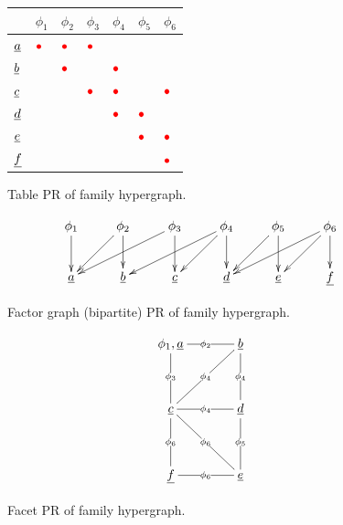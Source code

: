 \begin{itemize}
\begin{figure}[h!]
\begin{tabular}{|l|l|l|l|l|l|l|}
\hline
 & \cellcolor[HTML]{FFCCC9}$\phi_1$ & \cellcolor[HTML]{FFCCC9}$\phi_2$ & \cellcolor[HTML]{FFCCC9}$\phi_3$ & \cellcolor[HTML]{FFCCC9}$\phi_4$ & \cellcolor[HTML]{FFCCC9}$\phi_5$ & \cellcolor[HTML]{FFCCC9}$\phi_6$ \\ \hline
\cellcolor[HTML]{9AFF99}$\rva$ & $\color{red}\bullet$ & $\color{red}\bullet$ & $\color{red}\bullet$ &  &  &  \\ \hline
\cellcolor[HTML]{9AFF99}$\rvb$ &  & $\color{red}\bullet$ &  & $\color{red}\bullet$ &  &  \\ \hline
\cellcolor[HTML]{9AFF99}$\rvc$ &  &  & $\color{red}\bullet$ & $\color{red}\bullet$ &  & $\color{red}\bullet$ \\ \hline
\cellcolor[HTML]{9AFF99}$\rvd$ &  &  &  & $\color{red}\bullet$ & $\color{red}\bullet$ &  \\ \hline
\cellcolor[HTML]{9AFF99}$\rve$ &  &  &  &  & $\color{red}\bullet$ & $\color{red}\bullet$ \\ \hline
\cellcolor[HTML]{9AFF99}$\rvf$ &  &  &  &  &  & $\color{red}\bullet$ \\ \hline
\end{tabular}
\caption{Table PR of family hypergraph.}
\label{fig-tab-fam-hyper}
\end{figure}





\begin{figure}[h!]
$$
\xymatrix{
\phi_1\ar[d]
&\phi_2\ar[d]\ar[dl]
&\phi_3\ar[d]\ar[dll]
&\phi_4\ar[dll]\ar[dl]\ar[d]
&\phi_5\ar[d]\ar[dl]
&\phi_6\ar[dl]\ar[d]\ar[dll]
\\
\rva
&\rvb
&\rvc
&\rvd
&\rve
&\rvf
}
$$
\caption{Factor graph (bipartite) PR of
family hypergraph.}
\label{fig-fact-g-fam-hyper}
\end{figure}

\begin{figure}
$$
\xymatrix@C=3pc@R=3pc{
\phi_1,\rva
\ar@{-}[r]|{\phi_2}
\ar@{-}[d]|{\phi_3}
&{\rvb}
\ar@{-}[d]|{\phi_4}
\ar@{-}[dl]|{\phi_4}
\\
{\rvc}
\ar@{-}[r]|{\phi_4}
\ar@{-}[d]|{\phi_6}
\ar@{-}[dr]|{\phi_6}
&{\rvd}
\ar@{-}[d]|{\phi_5}
\\
\rvf
&\rve
\ar@{-}[l]|{\phi_6}
}
$$
\caption{Facet PR of family hypergraph.}
\label{fig-facet-fam-hyper}
\end{figure}

\end{itemize}

